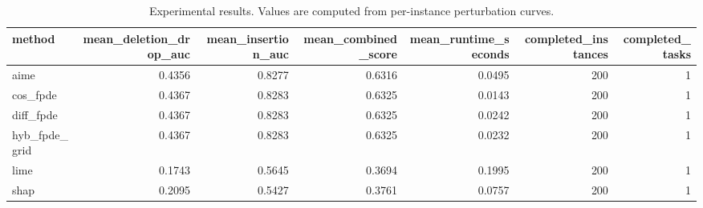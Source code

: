 \begin{table}[t]
\caption{Experimental results. Values are computed from per-instance perturbation curves.}
\label{tab:main_results_computed}
\centering
\begin{tabular}{lrrrrrr}
\toprule
method & mean\_deletion\_drop\_auc & mean\_insertion\_auc & mean\_combined\_score & mean\_runtime\_seconds & completed\_instances & completed\_tasks \\
\midrule
aime & 0.4356 & 0.8277 & 0.6316 & 0.0495 & 200 & 1 \\
cos\_fpde & 0.4367 & 0.8283 & 0.6325 & 0.0143 & 200 & 1 \\
diff\_fpde & 0.4367 & 0.8283 & 0.6325 & 0.0242 & 200 & 1 \\
hyb\_fpde\_grid & 0.4367 & 0.8283 & 0.6325 & 0.0232 & 200 & 1 \\
lime & 0.1743 & 0.5645 & 0.3694 & 0.1995 & 200 & 1 \\
shap & 0.2095 & 0.5427 & 0.3761 & 0.0757 & 200 & 1 \\
\bottomrule
\end{tabular}

\end{table}
